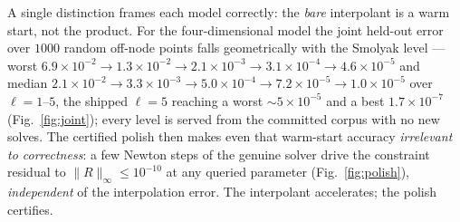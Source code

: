 \documentclass[
  aps,
  prd,
  twocolumn,
  amsmath,
  amssymb,
  nofootinbib,
  superscriptaddress,
  floatfix,
]{revtex4-2}
\begin{document}
A single distinction frames each model correctly: the \emph{bare} interpolant
is a warm start, not the product. For the four-dimensional model the joint held-out
error over $1000$ random off-node points falls geometrically with the Smolyak level
--- worst
$6.9\times10^{-2}\to1.3\times10^{-2}\to2.1\times10^{-3}\to3.1\times10^{-4}\to
4.6\times10^{-5}$ and median
$2.1\times10^{-2}\to3.3\times10^{-3}\to5.0\times10^{-4}\to7.2\times10^{-5}\to
1.0\times10^{-5}$ over $\ell=1$--$5$, the shipped $\ell=5$ reaching a worst
$\sim\!5\times10^{-5}$ and a best $1.7\times10^{-7}$ (Fig.~\ref{fig:joint}); every
level is served from the committed corpus with no new solves. The certified polish
then makes even that warm-start accuracy \emph{irrelevant to correctness}: a few
Newton steps of the genuine solver drive the constraint residual to
$\|R\|_\infty\le10^{-10}$ at any queried parameter (Fig.~\ref{fig:polish}),
\emph{independent} of the interpolation error. The interpolant accelerates; the
polish certifies.
\end{document}
